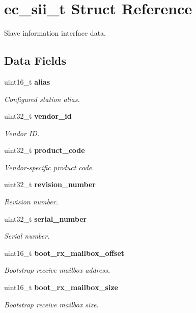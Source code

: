 \section{ec\-\_\-sii\-\_\-t \-Struct \-Reference}
\label{structec__sii__t}


\-Slave information interface data.  


\subsection*{\-Data \-Fields}
\begin{DoxyCompactItemize}
\item 
uint16\-\_\-t {\bf alias}
\begin{DoxyCompactList}\small\item\em \-Configured station alias. \end{DoxyCompactList}\item 
uint32\-\_\-t {\bf vendor\-\_\-id}
\begin{DoxyCompactList}\small\item\em \-Vendor \-I\-D. \end{DoxyCompactList}\item 
uint32\-\_\-t {\bf product\-\_\-code}
\begin{DoxyCompactList}\small\item\em \-Vendor-\/specific product code. \end{DoxyCompactList}\item 
uint32\-\_\-t {\bf revision\-\_\-number}
\begin{DoxyCompactList}\small\item\em \-Revision number. \end{DoxyCompactList}\item 
uint32\-\_\-t {\bf serial\-\_\-number}
\begin{DoxyCompactList}\small\item\em \-Serial number. \end{DoxyCompactList}\item 
uint16\-\_\-t {\bf boot\-\_\-rx\-\_\-mailbox\-\_\-offset}
\begin{DoxyCompactList}\small\item\em \-Bootstrap receive mailbox address. \end{DoxyCompactList}\item 
uint16\-\_\-t {\bf boot\-\_\-rx\-\_\-mailbox\-\_\-size}
\begin{DoxyCompactList}\small\item\em \-Bootstrap receive mailbox size. \end{DoxyCompactList}\item 

\end{DoxyCompactItemize}
